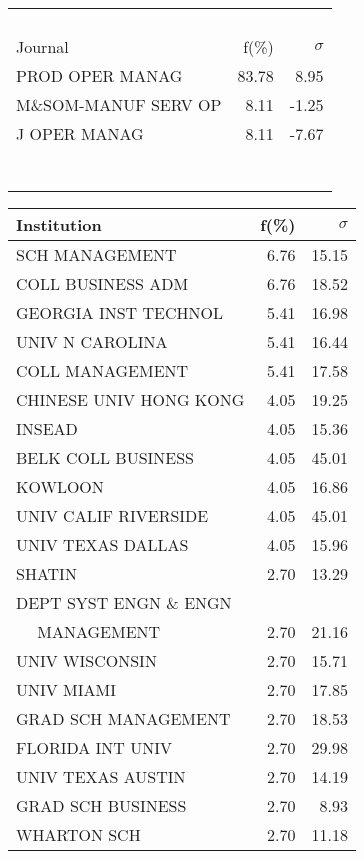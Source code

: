 \documentclass[a4paper,11pt]{report}
\begin{document}
\begin{landscape}
\begin{table}[!ht]
{\begin{tabular}{|l r  r|}
 &  & \\
 &  & \\
 &  & \\
 &  & \\
\hline
\hline
Journal & f(\%) & $\sigma$\\
\hline
PROD OPER MANAG & 83.78 & 8.95\\
M\&SOM-MANUF SERV OP & 8.11 & -1.25\\
J OPER MANAG & 8.11 & -7.67\\
 &  & \\
 &  & \\
 &  & \\
 &  & \\
 &  & \\
 &  & \\
 &  & \\
\hline
\end{tabular}
}
{\scriptsize\begin{tabular}{|l r r|}
\hline
Institution & f(\%) & $\sigma$\\
\hline
SCH MANAGEMENT & 6.76 & 15.15\\
COLL BUSINESS ADM & 6.76 & 18.52\\
GEORGIA INST TECHNOL & 5.41 & 16.98\\
UNIV N CAROLINA & 5.41 & 16.44\\
COLL MANAGEMENT & 5.41 & 17.58\\
CHINESE UNIV HONG KONG & 4.05 & 19.25\\
INSEAD & 4.05 & 15.36\\
BELK COLL BUSINESS & 4.05 & 45.01\\
KOWLOON & 4.05 & 16.86\\
UNIV CALIF RIVERSIDE & 4.05 & 45.01\\
UNIV TEXAS DALLAS & 4.05 & 15.96\\
SHATIN & 2.70 & 13.29\\
DEPT SYST ENGN \& ENGN &  & \\
$\quad$ MANAGEMENT & 2.70 & 21.16\\
UNIV WISCONSIN & 2.70 & 15.71\\
UNIV MIAMI & 2.70 & 17.85\\
GRAD SCH MANAGEMENT & 2.70 & 18.53\\
FLORIDA INT UNIV & 2.70 & 29.98\\
UNIV TEXAS AUSTIN & 2.70 & 14.19\\
GRAD SCH BUSINESS & 2.70 & 8.93\\
WHARTON SCH & 2.70 & 11.18\\

\end{tabular}}
\end{table}
\end{landscape}
\end{document}
